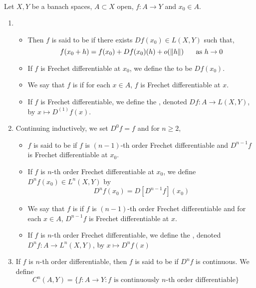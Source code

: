 \documentclass{book}
\begin{document}
	\begin{defn}  \\
	Let $X, Y$ be a banach spaces, $A \subset X$ open, $f:A \rightarrow Y$ and $x_0 \in A$. 
	\begin{enumerate}
	\item 
	\begin{itemize}
	\item Then $f$ is said to be  if there exists $Df(x_0) \in L(X,Y)$ such that, $$f(x_0 + h) = f(x_0) + Df(x_0)(h) + o(\|h\| ) \hspace{.5cm} \text{ as } h \rightarrow 0$$  
	\item If $f$ is Frechet differentiable at $x_0$, we define the  to be $Df(x_0)$. 
	\item We say that $f$ is  if for each $x \in A$, $f$ is Frechet differentiable at $x$. 
	\item If $f$ is Frechet differentiable, we define the , denoted $Df:A \rightarrow L(X, Y)$, by $x \mapsto D^{(1)}f(x)$. 
	\end{itemize}
	\item Continuing inductively, we set $D^0f = f$ and for $n \geq 2$, 
	\begin{itemize}
	\item $f$ is said to be  if $f$ is $(n-1)$-th order Frechet differentiable and $D^{n-1}f$ is Frechet differentiable at $x_0$. 
	\item If $f$ is $n$-th order Frechet differentiable at $x_0$, we define $D^nf(x_0) \in L^n( X, Y)$ by 
	$$D^nf(x_0) = D[D^{n-1}f](x_0)$$ 
	\item We say that $f$ is  if $f$ is $(n-1)$-th order Frechet differentiable and for each $x \in A$, $D^{n-1}f$ is Frechet differentiable at $x$. 
	\item If $f$ is $n$-th order Frechet differentiable, we define the , denoted $D^nf:A \rightarrow  L^n(X, Y)$, by $x \mapsto D^{n}f(x)$ \\
	\end{itemize}		
	\item If $f$ is $n$-th order differentiable, then $f$ is said to be  if $D^nf$ is continuous. We define $$C^n(A,Y) = \{f:A \rightarrow Y: f \text{ is continuously $n$-th order differentiable}\}$$
	
	\end{enumerate}
	\end{defn}
	
\end{document}
